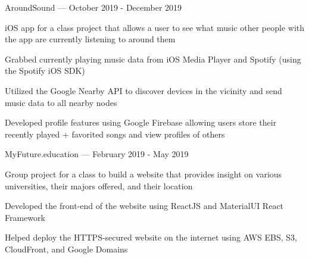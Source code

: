 


\begin{cventries}


\cventryalt
{AroundSound --- } %
{October 2019 - December 2019} %
{ %
\begin{cvitems}
\item {iOS app for a class project that allows a user to see what music other people with the app are currently listening to around them}
\item {Grabbed currently playing music data from iOS Media Player and Spotify (using the Spotify iOS SDK)}
\item {Utilized the Google Nearby API to discover devices in the vicinity and send music data to all nearby nodes}
\item {Developed profile features using Google Firebase allowing users store their recently played + favorited songs and view profiles of others}
\end{cvitems}
}


\cventryalt
{MyFuture.education --- } %
{February 2019 - May 2019} %
{ %
\begin{cvitems}
\item {Group project for a class to build a website that provides insight on various universities, their majors offered, and their location}
\item {Developed the front-end of the website using ReactJS and MaterialUI React Framework}
\item {Helped deploy the HTTPS-secured website on the internet using AWS EBS, S3, CloudFront, and Google Domains}
\end{cvitems}
}


\end{cventries}
